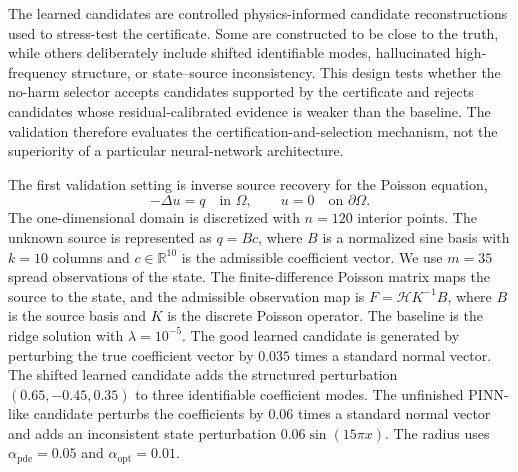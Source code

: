\documentclass{article}
\numberwithin{equation}{section}
\theoremstyle{definition}
\begin{document}
The learned candidates are controlled physics-informed candidate reconstructions used to stress-test the certificate. Some are constructed to be close to the truth, while others deliberately include shifted identifiable modes, hallucinated high-frequency structure, or state--source inconsistency. This design tests whether the no-harm selector accepts candidates supported by the certificate and rejects candidates whose residual-calibrated evidence is weaker than the baseline. The validation therefore evaluates the certification-and-selection mechanism, not the superiority of a particular neural-network architecture.

The first validation setting is inverse source recovery for the Poisson equation,
\begin{equation}
-\Delta u=q
\quad \text{in } \Omega,
\qquad
u=0
\quad \text{on } \partial\Omega .
\label{eq:poisson-source}
\end{equation}
The one-dimensional domain is discretized with \(n=120\) interior points. The unknown source is represented as \(q=Bc\), where \(B\) is a normalized sine basis with \(k=10\) columns and \(c\in\mathbb R^{10}\) is the admissible coefficient vector. We use \(m=35\) spread observations of the state. The finite-difference Poisson matrix maps the source to the state, and the admissible observation map is \(F=\mathcal H K^{-1}B\), where \(B\) is the source basis and \(K\) is the discrete Poisson operator. The baseline is the ridge solution with \(\lambda=10^{-5}\). The good learned candidate is generated by perturbing the true coefficient vector by \(0.035\) times a standard normal vector. The shifted learned candidate adds the structured perturbation \((0.65,-0.45,0.35)\) to three identifiable coefficient modes. The unfinished PINN-like candidate perturbs the coefficients by \(0.06\) times a standard normal vector and adds an inconsistent state perturbation \(0.06\sin(15\pi x)\). The radius uses \(\alpha_{\mathrm{pde}}=0.05\) and \(\alpha_{\mathrm{opt}}=0.01\).
\end{document}
